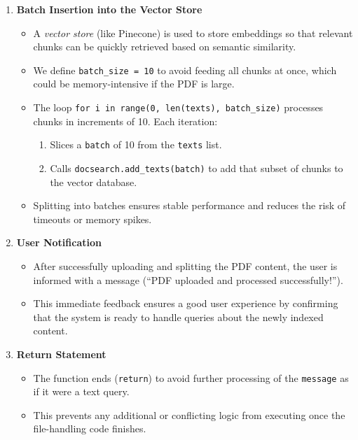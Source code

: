 \begin{enumerate}
    \item \textbf{Batch Insertion into the Vector Store}
    \begin{itemize}
        \item A \textit{vector store} (like Pinecone) is used to store embeddings so that relevant chunks can be quickly retrieved based on semantic similarity.
        \item We define \texttt{batch\_size = 10} to avoid feeding all chunks at once, which could be memory-intensive if the PDF is large.
        \item The loop \texttt{for i in range(0, len(texts), batch\_size)} processes chunks in increments of 10. Each iteration:
        \begin{enumerate}
            \item Slices a \texttt{batch} of 10 from the \texttt{texts} list.
            \item Calls \texttt{docsearch.add\_texts(batch)} to add that subset of chunks to the vector database. 
        \end{enumerate}
        \item Splitting into batches ensures stable performance and reduces the risk of timeouts or memory spikes.
    \end{itemize}

    \item \textbf{User Notification}
    \begin{itemize}
        \item After successfully uploading and splitting the PDF content, the user is informed with a message (``PDF uploaded and processed successfully!''). 
        \item This immediate feedback ensures a good user experience by confirming that the system is ready to handle queries about the newly indexed content.
    \end{itemize}

    \item \textbf{Return Statement}
    \begin{itemize}
        \item The function ends (\texttt{return}) to avoid further processing of the \texttt{message} as if it were a text query. 
        \item This prevents any additional or conflicting logic from executing once the file-handling code finishes.
    \end{itemize}
\end{enumerate}

